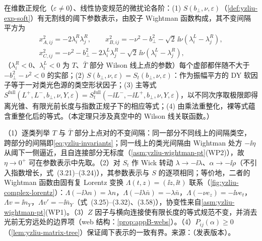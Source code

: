 \begin{theorem}\label{thm:yzliu-time-ordering}
在维数正规化（$\varepsilon\ne0$）、线性协变规范的微扰论各阶：(1) $S(b_\perp,\nu,\varepsilon)$（\cref{def:yzliu-exp-soft}）有无割线的阈下参数表示，由胶子 Wightman 函数构成，其不变间隔平方为 %
\begin{equation}\label{eq:yzliu-invariants}
\begin{gathered}
x^2_{A,ij}=-2\lambda^R_i\lambda^R_j,\qquad x^2_{B,ij}=-\nu^2-b_\perp^2-\sqrt2\,\ii\nu(\lambda^L_i-\lambda^R_j),\\
x^2_{C,ij}=-\nu^2-b_\perp^2-2\lambda^L_i\lambda^R_j-\sqrt2\,\ii\nu(\lambda^L_i-\lambda^R_j),
\end{gathered}
\end{equation}
（$\lambda^{R}_i<0$、$\lambda^L_i<0$ 为 $T$、$\bar T$ 部分 Wilson 线上点的参数）每个虚部都伴随不大于 $-b_\perp^2-\nu^2<0$ 的实部；(2) $S(b_\perp,\nu,\varepsilon)=S_t(b_\perp,\nu,\varepsilon)$：作为振幅平方的 DY 软因子等于一对类光色源的类空形状因子；(3) 主等式 $S^{\mathrm{full}}(L^+,L^-,b_\perp,\nu,Y,\varepsilon)=S_t^{\mathrm{full}}(-\ii L^-,-\ii L^+,b_\perp,\nu,Y,\varepsilon)$\cite[式~(3.71)；不等长度见式~(3.54)]{Liu:2023pjb}，以不同次序取极限即得离光锥、有限光前长度与指数正规子下的相应等式；(4) 由乘法重整化，裸等式蕴含重整化后的等式。（本定理只涉及真空中的 Wilson 线关联函数。）
\end{theorem}

\begin{proofsketch}
（1）逐类列举 $T$ 与 $\bar T$ 部分上点对的不变间隔：同一部分不同线上的间隔类空，跨部分的间隔即\cref{eq:yzliu-invariants}；同一线上的类光间隔由 Wightman 处方 $-\ii\eta$ 从阈下一侧逼近，且自连接部分无标度（\cref{asm:yzliu-wightman-pt}(WP2)），故 $\eta\to0^+$ 可在参数表示中先取\cite[第~3.1~节]{Liu:2023pjb}。（2）对 $S_t$ 作 Wick 转动 $\lambda\to-\ii\lambda$、$\alpha\to-\ii\rho$（不引入指数增长，式~(3.21)--(3.24)），其参数表示与 $S$ 的逐项相同；等价地，二者的 Wightman 函数由固有复 Lorentz 变换 $\Lambda(t,z)=(\ii z,\ii t)$ 联系（\cref{fig:yzliu-complex-lorentz}）：$\Lambda(-\ii\lambda n)=\lambda n$，$\Lambda(-\ii\lambda\bar n)=-\lambda\bar n$，$\Lambda(-\nu e_z)=-\ii\nu e_t$，$\Lambda v=\ii n_Y$，$\Lambda v'=-\ii\bar n_Y$（式~(3.25)--(3.32)、(3.58)），协变性来自\cref{asm:yzliu-wightman-pt}(WP1)。（3）$Z$ 因子与横向连接使有限长度的等式规范不变，并消去光前无穷远处的边界项（web 结构：\cref{prop:appB-webs}）。（4）$P_{ij}(\alpha)\ge0$（\cref{lem:yzliu-matrix-tree}）保证阈下表示的一致有界。来源：\cite{Liu:2023pjb}（发表版本）。
\end{proofsketch}

